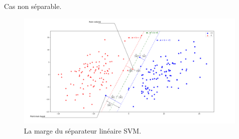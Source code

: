 \documentclass[8pt]{beamer}
\begin{document}
		\begin{frame}{Cas non séparable.}
			\begin{figure}[H]
				\includegraphics[width=\textwidth]{images/samples/stable_margin}
				\caption{\label{fig::stable_margin} La marge du séparateur linéaire SVM.}
			\end{figure}
		\end{frame}
\end{document}
